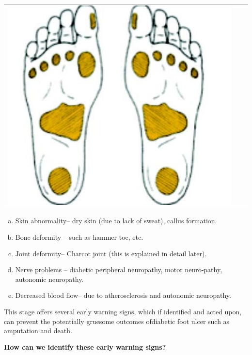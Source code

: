 \begin{center}
\begin{tabular}{@{}ccc@{}}
\includegraphics[scale=.8]{images/062.jpg}
\end{tabular}
\end{center}

\begin{enumerate}[a.]
\itemsep=0pt
\item Skin abnormality– dry skin (due to lack of sweat), callus formation.
\item Bone deformity – such as hammer toe, etc.
\item Joint deformity– Charcot joint (this is explained in detail later).
\item Nerve problems – diabetic peripheral neuropathy, motor neuro-\break pathy, autonomic neuro\-pathy.
\item Decreased blood flow– due to atherosclerosis and autonomic neuro\-pathy.
\end{enumerate}

This stage offers several early warning signs, which if identified and acted upon, can prevent the potentially gruesome outcomes of\break diabetic foot ulcer such as amputation and death.

\noindent\textbf{How can we identify these early warning signs?}

